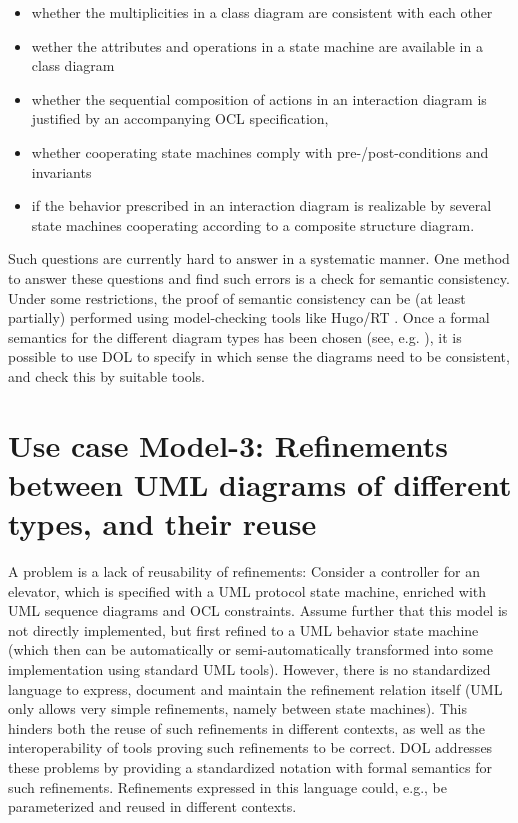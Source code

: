 \documentclass[10pt,%
\ifpretendfinal
final%
\else
draft%
\fi,
]{scrreprt}
\begin{document}
\begin{itemize}
\item whether the multiplicities in a class diagram are consistent with each other
\item wether the attributes and operations in a state machine are
available in a class diagram
\item	  whether the sequential composition of actions in an interaction diagram is justified by an accompanying OCL specification,
\item 	whether cooperating state machines comply with pre-/post-conditions and invariants
\item 	if the behavior prescribed in an interaction diagram is realizable by several state machines cooperating according to a composite structure diagram.
\end{itemize}
Such questions are currently hard to answer in a systematic manner. One method to answer these questions and find such errors is a check for semantic 
consistency. Under some restrictions, the proof of semantic consistency can be (at least partially) performed using model-checking tools like Hugo/RT \cite{HugoRT}. 
Once a formal semantics for the different diagram types has been chosen (see, e.g. \cite{HetUML}), it is possible to use DOL to specify in which 
sense the diagrams need to be consistent, and check this by suitable tools.

\section{Use case Model-3: Refinements between UML diagrams of different types, and their reuse}
A problem is a lack of reusability of refinements: Consider a controller for an elevator, which is specified with a UML protocol state machine, enriched with UML 
sequence diagrams and OCL constraints. Assume further that this model is not directly implemented, but first refined to a UML behavior state machine (which then 
can be automatically or semi-automatically transformed into some implementation using standard UML tools). However, there is no standardized language to 
express, document and maintain the refinement relation itself (UML only allows very simple refinements, namely between state machines). This hinders both the 
reuse of such refinements in different contexts, as well as the interoperability of tools proving such refinements to be correct. DOL  
addresses these problems by providing a standardized notation with formal semantics for such refinements. Refinements expressed in this language could, e.g., be 
parameterized and reused in different contexts.
\end{document}
